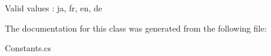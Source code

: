 Valid values \-: ja, fr, en, de 



The documentation for this class was generated from the following file\-:\begin{DoxyCompactItemize}
\item 
Constants.\-cs\end{DoxyCompactItemize}
